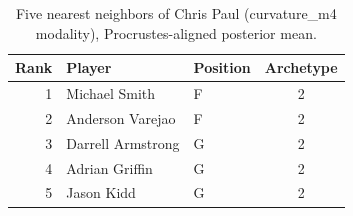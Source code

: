\begin{table}[htbp]
  \centering\small
  \begin{tabular}{rllc}
    \toprule
    Rank & Player & Position & Archetype \\
    \midrule
    1 & Michael Smith & F & 2 \\
    2 & Anderson Varejao & F & 2 \\
    3 & Darrell Armstrong & G & 2 \\
    4 & Adrian Griffin & G & 2 \\
    5 & Jason Kidd & G & 2 \\
    \bottomrule
  \end{tabular}
  \caption{Five nearest neighbors of Chris Paul (curvature_m4 modality), Procrustes-aligned posterior mean.}
  \label{tab:Chris_Paul_neighbors_curvature_m4}
\end{table}

